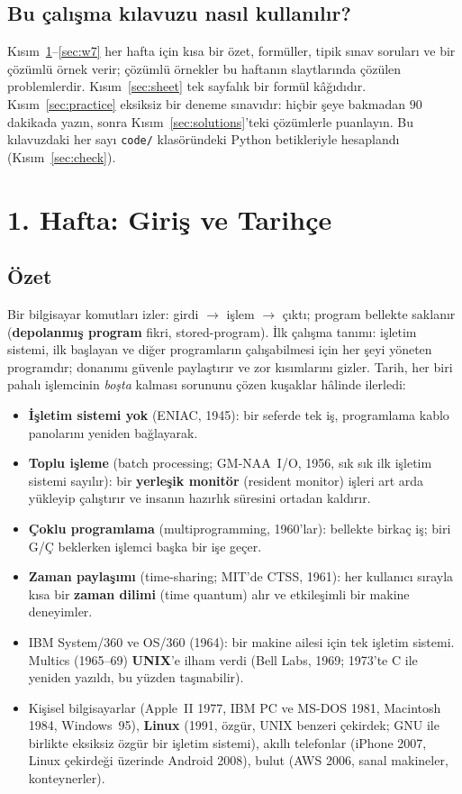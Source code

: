 \documentclass[11pt,a4paper]{article}
\newcommand{\term}[1]{\textbf{\color{mintdeep}#1}}
\begin{document}
\subsection{Bu çalışma kılavuzu nasıl kullanılır?}
Kısım~\ref{sec:w1}--\ref{sec:w7} her hafta için kısa bir özet, formüller, tipik sınav soruları ve bir çözümlü örnek verir; çözümlü örnekler bu haftanın slaytlarında çözülen problemlerdir. Kısım~\ref{sec:sheet} tek sayfalık bir formül kâğıdıdır. Kısım~\ref{sec:practice} eksiksiz bir deneme sınavıdır: hiçbir şeye bakmadan $90$ dakikada yazın, sonra Kısım~\ref{sec:solutions}'teki çözümlerle puanlayın. Bu kılavuzdaki her sayı \texttt{code/} klasöründeki Python betikleriyle hesaplandı (Kısım~\ref{sec:check}).

\section{1. Hafta: Giriş ve Tarihçe}
\label{sec:w1}
\subsection*{Özet}
Bir bilgisayar komutları izler: girdi $\to$ işlem $\to$ çıktı; program bellekte saklanır (\term{depolanmış program} fikri, stored-program). İlk çalışma tanımı: işletim sistemi, ilk başlayan ve diğer programların çalışabilmesi için her şeyi yöneten programdır; donanımı güvenle paylaştırır ve zor kısımlarını gizler. Tarih, her biri pahalı işlemcinin \emph{boşta} kalması sorununu çözen kuşaklar hâlinde ilerledi:
\begin{itemize}
  \item \textbf{İşletim sistemi yok} (ENIAC, 1945): bir seferde tek iş, programlama kablo panolarını yeniden bağlayarak.
  \item \textbf{Toplu işleme} (batch processing; GM-NAA~I/O, 1956, sık sık ilk işletim sistemi sayılır): bir \term{yerleşik monitör} (resident monitor) işleri art arda yükleyip çalıştırır ve insanın hazırlık süresini ortadan kaldırır.
  \item \textbf{Çoklu programlama} (multiprogramming, 1960'lar): bellekte birkaç iş; biri G/Ç beklerken işlemci başka bir işe geçer.
  \item \textbf{Zaman paylaşımı} (time-sharing; MIT'de CTSS, 1961): her kullanıcı sırayla kısa bir \term{zaman dilimi} (time quantum) alır ve etkileşimli bir makine deneyimler.
  \item IBM System/360 ve OS/360 (1964): bir makine ailesi için tek işletim sistemi. Multics (1965--69) \textbf{UNIX}'e ilham verdi (Bell Labs, 1969; 1973'te C ile yeniden yazıldı, bu yüzden taşınabilir).
  \item Kişisel bilgisayarlar (Apple~II 1977, IBM PC ve MS-DOS 1981, Macintosh 1984, Windows~95), \textbf{Linux} (1991, özgür, UNIX benzeri çekirdek; GNU ile birlikte eksiksiz özgür bir işletim sistemi), akıllı telefonlar (iPhone 2007, Linux çekirdeği üzerinde Android 2008), bulut (AWS 2006, sanal makineler, konteynerler).
\end{itemize}
\end{document}
